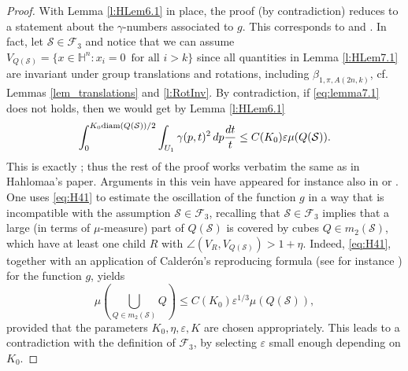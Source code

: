 \documentclass[12pt]{amsart}
\renewcommand{\H}{\mathbb H}
\newcommand{\diam}{{\rm diam}}
\numberwithin{equation}{section}
\theoremstyle{plain}
\theoremstyle{definition}
\theoremstyle{remark}
\begin{document}
\begin{proof}
With Lemma \ref{l:HLem6.1} in place, the proof (by contradiction) reduces to a statement about the $\gamma$-numbers associated to $g$. This corresponds to \cite[Section 7]{Hahlomaa} and \cite[Sections 11 and 14]{David1}. In fact, let $\mathcal S\in\mathcal F_3$ and notice that we can assume $V_{Q(\mathcal S)}=\{x\in\H^n:x_i=0\,\text{ for all }i>k\}$ since all quantities in Lemma \ref{l:HLem7.1} are invariant under group translations and rotations, including $\beta_{1,\pi,A(2n,k)}$, cf. Lemmas \ref{lem_translations} and \ref{l:RotInv}. By contradiction, if \eqref{eq:lemma7.1} does not holds, then we would get by Lemma \ref{l:HLem6.1} 
\begin{equation}\label{eq:H41}\int_0^{K_0 \diam(Q(\mathcal S))/2} \int_{U_1} \gamma(p,t)^2\, dp\frac{dt}{t}\leq C(K_0)\varepsilon \mu(Q(\mathcal{S})).\end{equation}
This is exactly \cite[equation (41)]{Hahlomaa}; thus the rest of the proof works verbatim the same as in Hahlomaa's paper. Arguments in this vein have appeared for instance also in \cite[Section 5]{MR1709304} or \cite[Section 14]{David1}.  One uses \eqref{eq:H41} to estimate the oscillation of the function $g$ in a way that is incompatible with the assumption $\mathcal S\in\mathcal F_3$, recalling that $\mathcal S\in\mathcal F_3$ implies that a large (in terms of $\mu$-measure) part of $Q(\mathcal{S})$ is covered by cubes $Q\in m_2(\mathcal{S})$, which have at least one child $R$ with $\angle(V_R, V_{Q(\mathcal S)})>1+\eta$. Indeed, \eqref{eq:H41}, together with an application of Calder\'{o}n's reproducing formula (see for instance \cite[Chapter 5]{MR2359017}) for the function $g$, yields
\begin{displaymath}
    \mu\left(\bigcup_{Q\in m_2(\mathcal{S})}Q\right) \leq C(K_0) \varepsilon^{1/3}\mu(Q(\mathcal{S})), 
\end{displaymath}
provided that the parameters $K_0, \eta, \varepsilon, K$ are chosen appropriately. This leads to a contradiction with the definition of $\mathcal F_3$, by selecting $\varepsilon$ small enough depending on $K_0$.
\end{proof}
\end{document}
